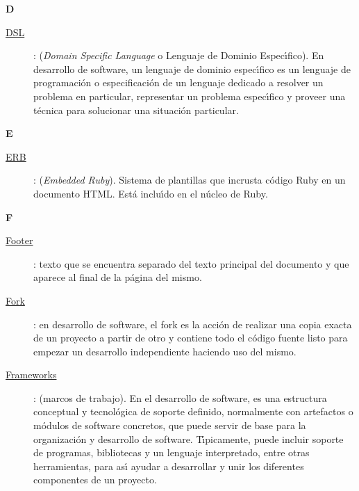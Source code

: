 \bigskip
{\bfseries {\Huge D}}\label{Apendice1:D}
\bigskip
\bigskip

\begin{description}
  \item[\underline{DSL}\label{apend1:dsl}]: (\textit{Domain Specific Language} o Lenguaje de Dominio Espec\'{\i}fico). En desarrollo de software, un lenguaje de dominio espec\'{\i}fico es 
  un lenguaje de programaci\'on o especificaci\'on de un lenguaje dedicado a resolver un problema en particular, representar un problema espec\'{\i}fico 
  y proveer una t\'ecnica para solucionar una situaci\'on particular. 
\end{description}

\bigskip
{\bfseries {\Huge E}}\label{Apendice1:E}
\bigskip
\bigskip

\begin{description}
  \item[\underline{ERB}\label{apend1:erb}]: (\textit{Embedded Ruby}). Sistema de plantillas que incrusta c\'odigo Ruby en un documento HTML. Est\'a inclu\'{\i}do en el n\'ucleo de Ruby.
\end{description}
\bigskip

\bigskip
{\bfseries {\Huge F}}\label{Apendice1:F}
\bigskip
\bigskip

\begin{description}
  \item[\underline{Footer}\label{apend1:footer}]: texto que se encuentra separado del texto principal del documento y que aparece al final de la p\'agina del mismo.
  \bigskip

  \item[\underline{Fork}\label{apend1:fork}]: en desarrollo de software, el fork es la acci\'on de realizar una copia exacta de un proyecto a partir de otro y contiene todo el c\'odigo fuente 
  listo para empezar un desarrollo independiente haciendo uso del mismo.
  \bigskip

  \item[\underline{Frameworks}\label{apend1:framework}]: (marcos de trabajo). En el desarrollo de software, es una estructura conceptual y tecnol\'ogica de soporte definido, normalmente con 
artefactos   o m\'odulos de software concretos, que puede servir de base para la organizaci\'on y desarrollo de software. T\'{\i}picamente, puede incluir soporte de programas, bibliotecas y 
  un lenguaje interpretado, entre otras herramientas, para as\'{\i} ayudar a desarrollar y unir los diferentes componentes de un proyecto.
  \bigskip
\end{description}
\newpage

